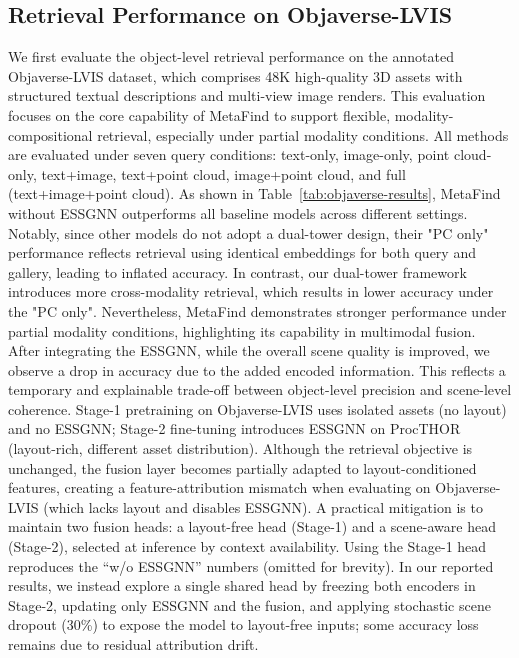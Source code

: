 \subsection{Retrieval Performance on Objaverse-LVIS}
We first evaluate the object-level retrieval performance on the annotated Objaverse-LVIS dataset, which comprises 48K high-quality 3D assets with structured textual descriptions and multi-view image renders. This evaluation focuses on the core capability of MetaFind to support flexible, modality-compositional retrieval, especially under partial modality conditions. All methods are evaluated under seven query conditions: text-only, image-only, point cloud-only, text+image, text+point cloud, image+point cloud, and full (text+image+point cloud). As shown in Table~\ref{tab:objaverse-results}, MetaFind without ESSGNN outperforms all baseline models across different settings. Notably, since other models do not adopt a dual-tower design, their "PC only" performance reflects retrieval using identical embeddings for both query and gallery, leading to inflated accuracy. In contrast, our dual-tower framework introduces more cross-modality retrieval, which results in lower accuracy under the "PC only". Nevertheless, MetaFind demonstrates stronger performance under partial modality conditions, highlighting its capability in multimodal fusion. After integrating the ESSGNN, while the overall scene quality is improved, we observe a drop in accuracy due to the added encoded information. This reflects a temporary and explainable trade-off between object-level precision and scene-level coherence. Stage-1 pretraining on Objaverse-LVIS uses isolated assets (no layout) and no ESSGNN; Stage-2 fine-tuning introduces ESSGNN on ProcTHOR (layout-rich, different asset distribution). Although the retrieval objective is unchanged, the fusion layer becomes partially adapted to layout-conditioned features, creating a feature-attribution mismatch when evaluating on Objaverse-LVIS (which lacks layout and disables ESSGNN). A practical mitigation is to maintain two fusion heads: a layout-free head (Stage-1) and a scene-aware head (Stage-2), selected at inference by context availability. Using the Stage-1 head reproduces the “w/o ESSGNN” numbers (omitted for brevity). In our reported results, we instead explore a single shared head by freezing both encoders in Stage-2, updating only ESSGNN and the fusion, and applying stochastic scene dropout (30\%) to expose the model to layout-free inputs; some accuracy loss remains due to residual attribution drift.


